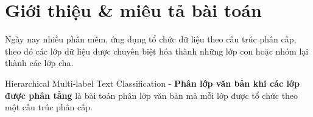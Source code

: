 \documentclass[12pt]{article}
\begin{document}
\begin{titlepage}
\vfill
\end{titlepage}

\tableofcontents
\listoffigures
\listoftables
\pagebreak

\section{Giới thiệu \& miêu tả bài toán}
Ngày nay nhiều phần mềm, ứng dụng tổ chức dữ liệu theo cấu trúc phân cấp, theo đó các lớp dữ liệu được chuyên biệt hóa thành những lớp con hoặc nhóm lại thành các lớp cha.\cite{huang2019hierarchical}

Hierarchical Multi-label Text Classification - \textbf{Phân lớp văn bản khi các lớp được phân tầng} là bài toán phân lớp văn bản mà mỗi lớp được tổ chức theo một cấu trúc phân cấp.
\end{document}
